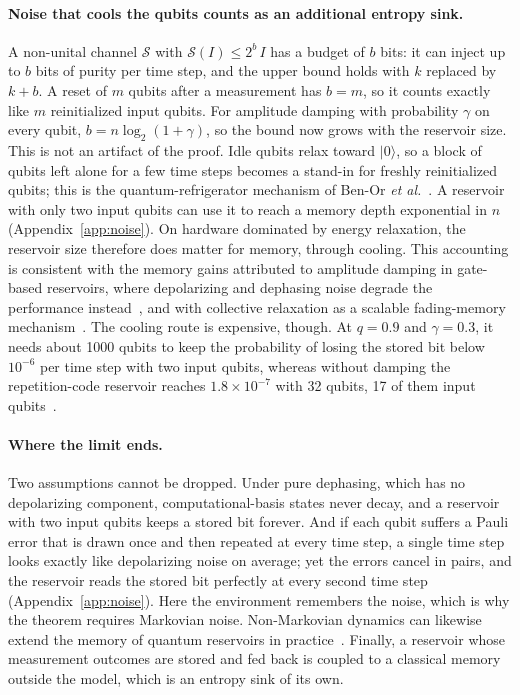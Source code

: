 \documentclass[aps,pra,reprint,superscriptaddress,floatfix]{revtex4-2}
\theoremstyle{plain}
\newcommand{\ket}[1]{|#1\rangle}
\begin{document}
\paragraph*{Noise that cools the qubits counts as an additional entropy sink.}
A non-unital channel $\mathcal S$ with $\mathcal S(I)\le2^b\,I$ has a budget of $b$ bits: it can inject up to $b$ bits of purity per time step, and the upper bound holds with $k$ replaced by $k+b$. A reset of $m$ qubits after a measurement has $b=m$, so it counts exactly like $m$ reinitialized input qubits. For amplitude damping with probability $\gamma$ on every qubit, $b=n\log_2(1+\gamma)$, so the bound now grows with the reservoir size. This is not an artifact of the proof. Idle qubits relax toward $\ket0$, so a block of qubits left alone for a few time steps becomes a stand-in for freshly reinitialized qubits; this is the quantum-refrigerator mechanism of Ben-Or \emph{et al.}~\cite{BenOr2013}. A reservoir with only two input qubits can use it to reach a memory depth exponential in $n$ (Appendix~\ref{app:noise}). On hardware dominated by energy relaxation, the reservoir size therefore does matter for memory, through cooling. This accounting is consistent with the memory gains attributed to amplitude damping in gate-based reservoirs, where depolarizing and dephasing noise degrade the performance instead~\cite{Monzani2024}, and with collective relaxation as a scalable fading-memory mechanism~\cite{Freiheit2026}. The cooling route is expensive, though. At $q=0.9$ and $\gamma=0.3$, it needs about 1000 qubits to keep the probability of losing the stored bit below $10^{-6}$ per time step with two input qubits, whereas without damping the repetition-code reservoir reaches $1.8\times10^{-7}$ with 32 qubits, 17 of them input qubits~\cite{SM}.

\paragraph*{Where the limit ends.}
Two assumptions cannot be dropped. Under pure dephasing, which has no depolarizing component, computational-basis states never decay, and a reservoir with two input qubits keeps a stored bit forever. And if each qubit suffers a Pauli error that is drawn once and then repeated at every time step, a single time step looks exactly like depolarizing noise on average; yet the errors cancel in pairs, and the reservoir reads the stored bit perfectly at every second time step (Appendix~\ref{app:noise}). Here the environment remembers the noise, which is why the theorem requires Markovian noise. Non-Markovian dynamics can likewise extend the memory of quantum reservoirs in practice~\cite{Sannia2026}. Finally, a reservoir whose measurement outcomes are stored and fed back is coupled to a classical memory outside the model, which is an entropy sink of its own.
\end{document}
